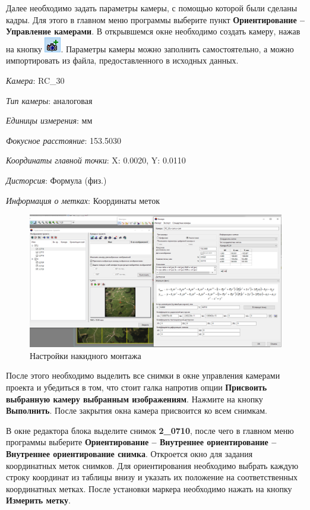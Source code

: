 \documentclass[
  12pt,
]{book}
\begin{document}
Далее необходимо задать параметры камеры, с помощью которой были сделаны кадры. Для этого в главном меню программы выберите пункт \textbf{Ориентирование -- Управление камерами}. В открывшемся окне необходимо создать камеру, нажав на кнопку \includegraphics{images/Ref15/Create_Camera.png}. Параметры камеры можно заполнить самостоятельно, а можно импортировать из файла, предоставленного в исходных данных.

\emph{Камера}: RC\_30

\emph{Тип камеры}: аналоговая

\emph{Единицы измерения}: мм

\emph{Фокусное расстояние}: 153.5030

\emph{Координаты главной точки}: X: 0.0020, Y: 0.0110

\emph{Дисторсия}: Формула (физ.)

\emph{Информация о метках}: Координаты меток

\begin{figure}
\centering
\includegraphics{images/Ref15/Camera.png}
\caption{Настройки накидного монтажа}
\end{figure}

После этого необходимо выделить все снимки в окне управления камерами проекта и убедиться в том, что стоит галка напротив опции \textbf{Присвоить выбранную камеру выбранным изображениям}. Нажмите на кнопку \textbf{Выполнить}. После закрытия окна камера присвоится ко всем снимкам.

В окне редактора блока выделите снимок \textbf{2\_0710}, после чего в главном меню программы выберите \textbf{Ориентирование -- Внутреннее ориентирование -- Внутреннее ориентирование снимка}. Откроется окно для задания координатных меток снимков. Для ориентирования необходимо выбрать каждую строку координат из таблицы внизу и указать их положение на соответственных координатных метках. После установки маркера необходимо нажать на кнопку \textbf{Измерить метку}.
\end{document}

